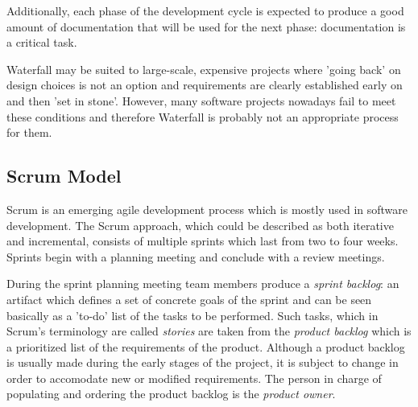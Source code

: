 Additionally, each phase of the development cycle is expected to produce a good amount of documentation
that will be used for the next phase: documentation is a critical task.

Waterfall may be suited to large-scale, expensive projects where 'going back' on design
choices is not an option and requirements are clearly established early on and then 'set in stone'.
However, many software projects nowadays fail to meet these conditions and therefore Waterfall is probably not an appropriate process for them.


\subsection{Scrum Model} \nocite{Compendium}

Scrum is an emerging agile development process which is mostly used in software development.
The Scrum approach, which could be described as both iterative and incremental, consists of multiple sprints
which last from two to four weeks. Sprints begin with a planning meeting and conclude with a review meetings.

During the sprint planning meeting team members produce a \emph{sprint backlog}: an artifact which defines a set of
concrete goals of the sprint and can be seen basically as a 'to-do' list of the tasks to be performed.
Such tasks, which in Scrum's terminology are called \emph{stories} are taken from the
\emph{product backlog} which is a prioritized list of the requirements of the product.
Although a product backlog is usually made during the early stages of the project, it is subject to
change in order to accomodate new or modified requirements. The person in charge of populating and ordering
the product backlog is the \emph{product owner}.

